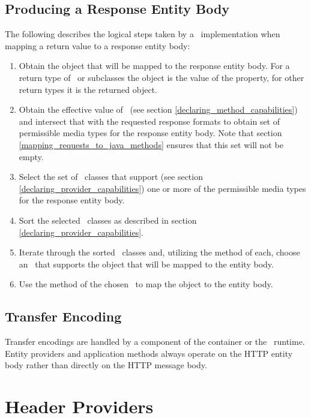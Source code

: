 \subsection{Producing a Response Entity Body}

The following describes the logical steps taken by a \jaxrs\ implementation when mapping a return value to a response entity body:

\begin{enumerate}
\item Obtain the object that will be mapped to the response entity body. For a return type of \Response\ or subclasses the object is the value of the  property, for other return types it is the returned object.
\item Obtain the effective value of \ProduceMime\ (see section \ref{declaring_method_capabilities}) and intersect that with the requested response formats to obtain set of permissible media types for the response entity body. Note that section \ref{mapping_requests_to_java_methods} ensures that this set will not be empty.
\item Select the set of \EntityProvider\ classes that support (see section \ref{declaring_provider_capabilities}) one or more of the permissible media types for the response entity body.
\item Sort the selected \EntityProvider\ classes as described in section \ref{declaring_provider_capabilities}.
\item Iterate through the sorted \EntityProvider\ classes and, utilizing the  method of each, choose an \EntityProvider\ that supports the object that will be mapped to the entity body.
\item Use the  method of the chosen \EntityProvider\ to map the object to the entity body.
\end{enumerate}

\subsection{Transfer Encoding}

Transfer encodings are handled by a component of the container or the \jaxrs\ runtime. Entity providers and application methods always operate on the HTTP entity body rather than directly on the HTTP message body.

\section{Header Providers}
\label{header_providers}

